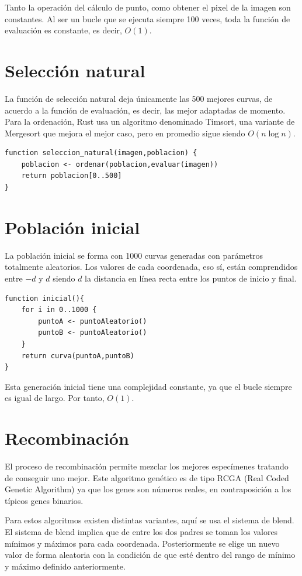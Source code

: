 \documentclass{report}
\begin{document}
Tanto la operación del cálculo de punto, como obtener el pixel de la imagen son constantes. Al ser un bucle que se ejecuta siempre 100 veces, toda la función de evaluación es constante, es decir, $ O(1) $.

\section{Selección natural}

La función de selección natural deja únicamente las 500 mejores curvas, de acuerdo a la función de evaluación, es decir, las mejor adaptadas de momento. Para la ordenación, Rust usa
un algoritmo denominado Timsort, una variante de Mergesort que mejora el mejor caso, pero en promedio sigue siendo $ O(n\log{n}) $. 

\begin{lstlisting}
function seleccion_natural(imagen,poblacion) {
	poblacion <- ordenar(poblacion,evaluar(imagen))
	return poblacion[0..500]
}
\end{lstlisting}

\section{Población inicial}
La población inicial se forma con 1000 curvas generadas con parámetros totalmente aleatorios. Los valores de cada coordenada, eso sí, están 
comprendidos entre $-d$ y $d$ siendo $d$ la distancia en línea recta entre los puntos de inicio y final.

\begin{lstlisting}
function inicial(){
	for i in 0..1000 {
		puntoA <- puntoAleatorio()
		puntoB <- puntoAleatorio()
	}
	return curva(puntoA,puntoB)
}
\end{lstlisting}

Esta generación inicial tiene una complejidad constante, ya que el bucle siempre es igual de largo. Por tanto, $ O(1) $.

\section{Recombinación}

El proceso de recombinación permite mezclar los mejores especímenes tratando de conseguir uno mejor. Este algoritmo genético es de tipo
RCGA (Real Coded Genetic Algorithm) ya que los genes son números reales, en contraposición a los típicos genes binarios.

Para estos algoritmos existen distintas variantes, aquí se usa el sistema de blend. El sistema de blend implica que de entre los dos padres
se toman los valores mínimos y máximos para cada coordenada. Posteriormente se elige un nuevo valor de forma aleatoria con la condición de que 
esté dentro del rango de mínimo y máximo definido anteriormente.
\end{document}
